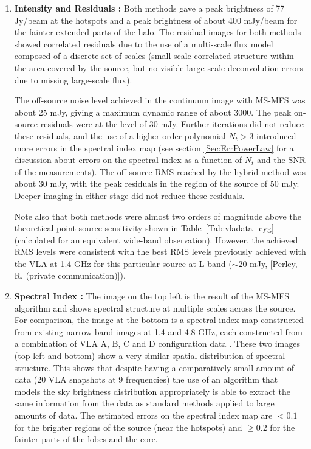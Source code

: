 \documentclass[structabstract]{stylefiles/aa}
\renewcommand{\cite}{\citep}
\begin{document}
\begin{enumerate}
\item {\bf Intensity and Residuals :}  
Both methods gave a peak brightness of 77 Jy/beam at the hotspots 
and a peak brightness of about 400 mJy/beam for the
fainter extended parts of the halo. 
The residual images for both methods  
showed correlated residuals due to the use of a multi-scale
flux model composed of a discrete set of scales (small-scale correlated structure within 
the area covered by the source, but no visible large-scale deconvolution errors due to
missing large-scale flux). 

The off-source noise level 
achieved in the continuum image with MS-MFS was about 25 mJy,
giving a maximum dynamic range of
about 3000. The peak on-source residuals were at the level of 30 mJy.
Further iterations did not reduce these
residuals, and the use of a higher-order polynomial $N_t>3$ introduced more errors in
the spectral index map (see section \ref{Sec:ErrPowerLaw} for a discussion about errors
on the spectral index as a function
of $N_t$ and the SNR of the measurements). 
%
The off source RMS reached by the hybrid method was about 30 mJy, with the peak residuals
in the region of the source of 50 mJy. Deeper imaging in either stage did not
reduce these residuals.

Note also that both methods were almost two orders of magnitude above the theoretical point-source
sensitivity shown in Table~\ref{Tab:vladata_cyg} (calculated for
an equivalent wide-band observation).
However, the achieved RMS levels were consistent with the best RMS levels previously achieved
with the VLA at 1.4 GHz for this particular source at 
L-band ($\sim$20 mJy, [Perley, R. (private communication)]).


\item {\bf Spectral Index : }
The image on the top left is the result of the MS-MFS algorithm and shows 
spectral structure at multiple scales across the source.  
For comparison, the image at the bottom is a spectral-index map constructed
from existing narrow-band images at 1.4 and 4.8 GHz, each constructed from 
a combination of VLA A, B, C and D configuration data \cite{CYGA_1991}.
These two images (top-left and bottom) show a very similar spatial distribution
of spectral structure. This shows that despite having a comparatively small amount
of data (20 VLA snapshots at 9 frequencies) the use of an algorithm that models
the sky brightness distribution appropriately is able to extract the same information
from the data as standard methods applied to large amounts of data.
The estimated errors on the spectral index map are $<0.1$ for the brighter regions
of the source (near the hotspots) and $\ge 0.2$ for the fainter parts of the lobes
and the core.


\end{enumerate}
\end{document}

